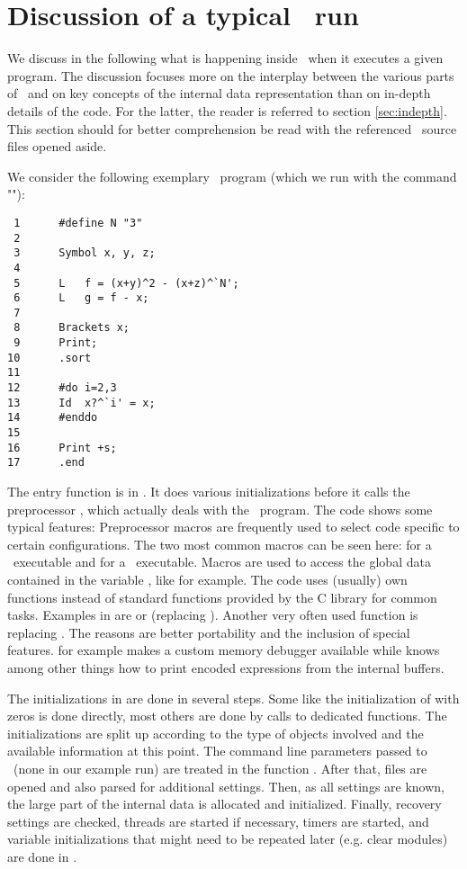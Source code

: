 \section{Discussion of a typical \FORM\ run}

We discuss in the following what is happening inside \FORM\ when it executes a
given program. The discussion focuses more on the interplay between the various
parts of \FORM\ and on key concepts of the internal data representation than on
in-depth details of the code. For the latter, the reader is referred to section
\ref{sec:indepth}. This section should for better comprehension be read with the
referenced \FORM\ source files opened aside.

We consider the following exemplary \FORM\ program  (which we run
with the command ""):

\begin{verbatim}
 1      #define N "3"
 2      
 3      Symbol x, y, z;
 4      
 5      L	f = (x+y)^2 - (x+z)^`N';
 6      L	g = f - x;
 7      
 8      Brackets x;
 9      Print;
10      .sort
11      
12      #do i=2,3
13      Id	x?^`i' = x;
14      #enddo
15      
16      Print +s;
17      .end
\end{verbatim}

The entry function  is in . It does various
initializations before it calls the preprocessor , which
actually deals with the \FORM\ program. The code shows some typical features:
Preprocessor macros are frequently used to select code specific to certain
configurations. The two most common macros can be seen here: 
for a \TFORM\ executable and  for a \PARFORM\ executable. Macros are
used to access the global data contained in the variable , like 
 for example. The code uses (usually) own functions instead of
standard functions provided by the C library for common tasks. Examples in
 are  or  (replacing ). Another
very often used function is  replacing . The reasons
are better portability and the inclusion of special features.   for
example makes a custom memory debugger available while  knows
among other things how to print encoded expressions from the internal buffers.

The initializations in  are done in several steps. Some like the
initialization of  with zeros is done directly, most others are done by
calls to dedicated functions. The initializations are split up according to the
type of objects involved and the available information at this point. The
command line parameters passed to \FORM\ (none in our example run) are treated
in the function . After that, files are opened and also parsed for
additional settings. Then, as all settings are known, the large part of the
internal data is allocated and initialized. Finally, recovery settings are
checked, threads are started if necessary, timers are started, and variable
initializations that might need to be repeated later (e.g. clear modules) are
done in .

